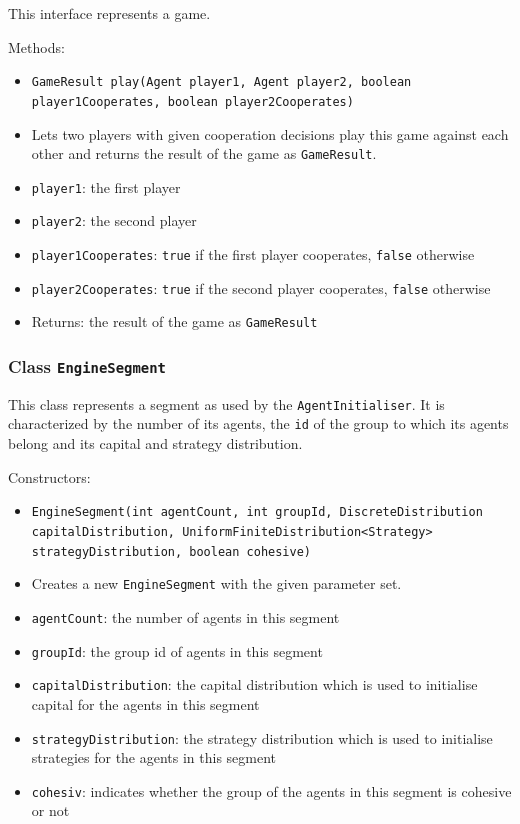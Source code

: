 \documentclass[parskip=full,11pt]{scrartcl}
\begin{document}
This interface represents a game.

Methods:
\begin{itemize}\itemsep -10pt
\item[] \texttt{GameResult play(Agent player1, Agent player2, boolean player1Cooperates, boolean player2Cooperates)}
\item[] Lets two players with given cooperation decisions play this game against each other and returns the result of the game as \texttt{GameResult}.
\item[] \texttt{player1}: the first player
\item[] \texttt{player2}: the second player
\item[] \texttt{player1Cooperates}: \texttt{true} if the first player cooperates, \texttt{false} otherwise
\item[] \texttt{player2Cooperates}: \texttt{true} if the second player cooperates, \texttt{false} otherwise
\item[] Returns: the result of the game as \texttt{GameResult}
\end{itemize}

\subsubsection{Class \texttt{EngineSegment}}

This class represents a segment as used by the \texttt{AgentInitialiser}. It is characterized by the number of its agents, the \texttt{id} of the group to which its agents belong and its capital and strategy distribution.

Constructors:
\begin{itemize} \itemsep -10pt
	\item \texttt{EngineSegment(int agentCount, int groupId, DiscreteDistribution capitalDistribution, UniformFiniteDistribution<Strategy> strategyDistribution, boolean cohesive)}
	\item[] Creates a new \texttt{EngineSegment} with the given parameter set.
	\item[] \texttt{agentCount}: the number of agents in this segment
	\item[] \texttt{groupId}: the group id of agents in this segment
	\item[] \texttt{capitalDistribution}: the capital distribution which is used to initialise capital for the agents in this segment
	\item[] \texttt{strategyDistribution}: the strategy distribution which is used to initialise strategies for the agents in this segment
	\item[] \texttt{cohesiv}: indicates whether the group of the agents in this segment is cohesive or not
\end{itemize}
\end{document}
